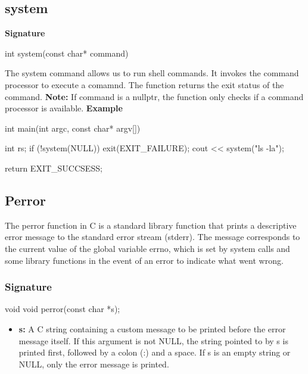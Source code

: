 \documentclass{report}
\begin{document}
    \bigbreak \noindent 
    \subsection{system}
    \bigbreak \noindent 
    \textbf{Signature}
    \bigbreak \noindent 
    \begin{cppcode}
    int system(const char* command)
    \end{cppcode}
    \bigbreak \noindent 
    The system command allows us to run shell commands. It invokes the command processor to execute a comamnd. The function returns the exit status of the command.
    \bigbreak \noindent 
    \textbf{Note:} If command is a nullptr, the function only checks if a command processor is available. 
    \bigbreak \noindent 
    \textbf{Example}
    \bigbreak \noindent 
    \begin{cppcode}
        int main(int argc, const char* argv[]) {
            int rs;
            if (!system(NULL)) {
                exit(EXIT_FAILURE);
            }
            cout << system("ls -la");

            return EXIT_SUCCSESS;
        }
    \end{cppcode}

    \bigbreak \noindent 
    \subsection{Perror}
    \bigbreak \noindent 
    \begin{concept}
       The perror function in C is a standard library function that prints a descriptive error message to the standard error stream (stderr). The message corresponds to the current value of the global variable errno, which is set by system calls and some library functions in the event of an error to indicate what went wrong. 
    \end{concept}
    \bigbreak \noindent 
    \subsubsection{Signature}
    \bigbreak \noindent 
    \begin{cppcode}
    void void perror(const char *s);
    \end{cppcode}
    \begin{itemize}
        \item \textbf{s:} A C string containing a custom message to be printed before the error message itself. If this argument is not NULL, the string pointed to by s is printed first, followed by a colon (:) and a space. If s is an empty string or NULL, only the error message is printed.        
    \end{itemize}
    \bigbreak \noindent 
\end{document}
